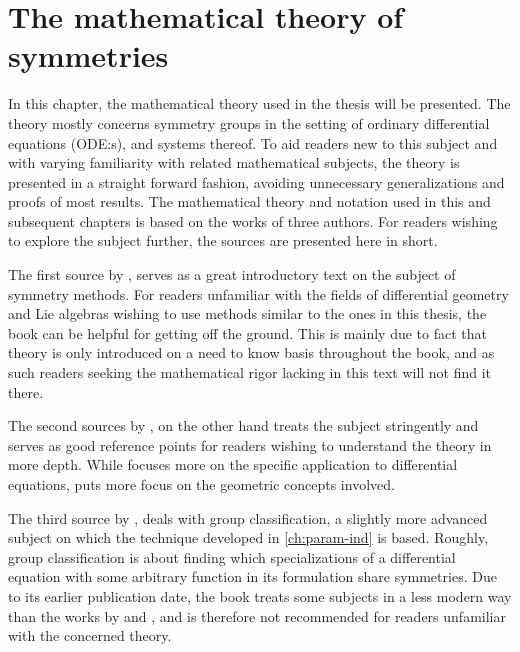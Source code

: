 \chapter{The mathematical theory of symmetries}

In this chapter, the mathematical theory used in the thesis will be presented.
The theory mostly concerns symmetry groups in the setting of ordinary differential equations (ODE:s), and systems thereof.
To aid readers new to this subject and with varying familiarity with related mathematical subjects, the theory is presented in a straight forward fashion, avoiding unnecessary generalizations and proofs of most results.
The mathematical theory and notation used in this and subsequent chapters is based on the works of three authors.
For readers wishing to explore the subject further, the sources are presented here in short.

The first source \cite{hydon2000symmetry} by \citeauthor{hydon2000symmetry}, serves as a great introductory text on the subject of symmetry methods.
For readers unfamiliar with the fields of differential geometry and Lie algebras wishing to use methods similar to the ones in this thesis, the book can be helpful for getting off the ground.
This is mainly due to fact that theory is only introduced on a need to know basis throughout the book, and as such readers seeking the mathematical rigor lacking in this text will not find it there.

The second sources \cite{olver1993applications,olver1995equivalence} by \citeauthor{olver1993applications}, on the other hand treats the subject stringently and serves as good reference points for readers wishing to understand the theory in more depth.
While \cite{olver1993applications} focuses more on the specific application to differential equations, \cite{olver1995equivalence} puts more focus on the geometric concepts involved.

The third source \cite{ovsiannikov1982group} by \citeauthor{ovsiannikov1982group}, deals with group classification, a slightly more advanced subject on which the technique developed in \cref{ch:param-ind} is based.
Roughly, group classification is about finding which specializations of a differential equation with some arbitrary function in its formulation share symmetries.
Due to its earlier publication date, the book treats some subjects in a less modern way than the works by \citeauthor{hydon2000symmetry} and \citeauthor{olver1993applications}, and is therefore not recommended for readers unfamiliar with the concerned theory.

